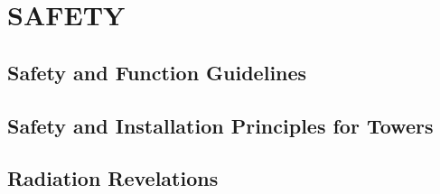 \documentclass[12pt]{book}
\begin{document}
\chapter{SAFETY}
\section{Safety and Function Guidelines}












\section{Safety and Installation Principles for Towers}











\section{Radiation Revelations}













\end{document}
